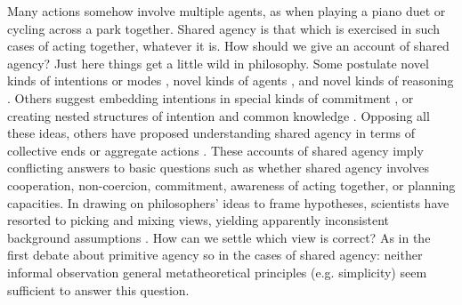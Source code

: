 \documentclass[12pt]{extarticle}
\date{}
\begin{document}
\begin{multicols*}{3}

\setlength\footnotesep{1em}











Many actions somehow involve multiple agents, as when playing a piano duet or cycling across a park together. Shared agency is that which is exercised in such cases of acting together, whatever it is. How should we give an account of shared agency? Just here things get a little wild in philosophy. Some postulate novel kinds of intentions \citep{Searle:1990em} or modes \citep{gallotti:2013_social}, novel kinds of agents \citep{helm_plural_2008}, and novel kinds of reasoning \citep{Gold:2007zd}. Others suggest embedding intentions in special kinds of commitment \citep{gilbert:2014_book}, or creating nested structures of intention and common knowledge \citep{bratman:2014_book}. Opposing all these ideas, others have proposed understanding shared agency in terms of collective ends \citep{miller_social_2001} or aggregate actions \citep{chant_unintentional_2007}. These accounts of shared agency imply conflicting answers to basic questions such as whether shared agency involves cooperation, non-coercion, commitment, awareness of acting together, or planning capacities. In drawing on philosophers’ ideas to frame hypotheses, scientists have resorted to picking and mixing views, yielding apparently inconsistent background assumptions \citep[e.g.][]{Tomasello:2005wx}. How can we settle which view is correct? As in the first debate about primitive agency so in the cases of shared agency: neither informal observation general metatheoretical principles (e.g. simplicity) seem sufficient to answer this question.




\footnotesize


\end{multicols*}
\end{document}
